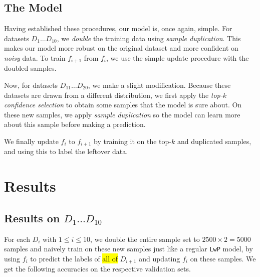 \documentclass{article} %
\begin{document}
\subsection{The Model}
Having established these procedures, our model is, once again, simple. For datasets $D_1 \dots D_{10}$, we \textit{double} the training data using \textit{sample duplication}. This makes our model more robust on the original dataset and more confident on \textit{noisy} data. To train $f_{i + 1}$ from $f_i$, we use the simple update procedure with the doubled samples.

Now, for datasets $D_{11} \dots D_{20}$, we make a slight modification. Because these datasets are drawn from a different distribution, we first apply the \textit{top-$k$ confidence selection} to obtain some samples that the model is sure about. On these new samples, we apply \textit{sample duplication} so the model can learn more about this sample before making a prediction.

We finally update $f_i$ to $f_{i + 1}$ by training it on the top-$k$ and duplicated samples, and using this to label the leftover data.
\section{Results}
\subsection{Results on $D_1 \dots D_{10}$}
For each $D_i$ with $1 \leq i \leq 10$, we double the entire sample set to $2500 \times 2 = 5000$ samples and naively train on these new samples just like a regular \texttt{LwP} model, by using $f_i$ to predict the labels of \hl{all of} $D_{i + 1}$ and updating $f_i$ on these samples. We get the following accuracies on the respective validation sets.
\end{document}
